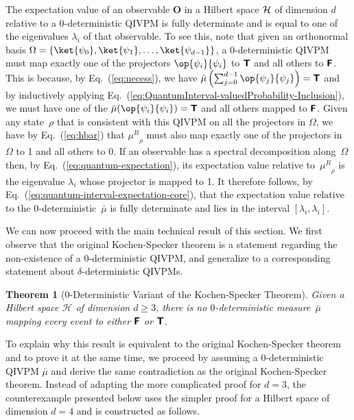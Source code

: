 \documentclass[english,reprint, aps, prl,superscriptaddress, showpacs,
showkeys, longbibliography, amsmath, amssymb, floatfix]{revtex4-1}
\theoremstyle{plain}
\newtheorem{thm}{Theorem}
\theoremstyle{definition}
\newcommand{\Hilb}{\mathcal{H}}
\newcommand{\interval}[1]{{\normalfont\textsf{\textbf{#1}}}}
\newcommand{\imposs}{\interval{F}}
\newcommand{\necess}{\interval{T}}
\newcommand{\proj}[1]{\op{#1}{#1}}
\newcommand{\muB}{\ensuremath{\mu^{B}}}
\begin{document}
The expectation value of an observable $\mathbf{O}$ in a Hilbert space
${\cal H}$ of dimension $d$ relative to a 0-deterministic QIVPM is
fully determinate and is equal to one of the eigenvalues $\lambda_i$
of that observable. To see this, note that given an orthonormal basis
$\Omega=\{ \ket{\psi_0},\ket{\psi_1},\ldots,\ket{\psi_{d-1}}\}$, a
0-deterministic QIVPM must map exactly one of the projectors
$\proj{\psi_i}$ to $\necess$ and all others to $\imposs$. This is
because, by Eq.~(\ref{eq:necess}), we have
$\bar{\mu}\left(\sum_{j=0}^{d-1}{\proj{\psi_j}}\right)=\necess$ and by
inductively applying
Eq.~(\ref{eq:QuantumInterval-valuedProbability-Inclusion}), we must
have one of the $\bar{\mu}(\proj{\psi_i})=\necess$ and all others
mapped to $\imposs$. Given any state~$\rho$ that is consistent with
this QIVPM on all the projectors in $\Omega$, we have by
Eq.~(\ref{eq:hbar}) that $\muB_{\rho}$ must also map exactly one of
the projectors in $\Omega$ to 1 and all others to 0. If an observable
has a spectral decomposition along~$\Omega$ then, by
Eq.~(\ref{eq:quantum-expectation}), its expectation value relative
to~$\muB_{\rho}$ is the eigenvalue $\lambda_i$ whose projector is
mapped to 1. It therefore follows, by
Eq.~(\ref{eq:quantum-interval-expectation-core}), that the expectation
value relative to the 0-deterministic~${\bar{\mu}}$ is fully
determinate and lies in the interval $[\lambda_i,\lambda_i]$.

We can now proceed with the main technical result of this section. We
first observe that the original Kochen-Specker theorem is a statement
regarding the non-existence of a $0$-deterministic QIVPM, and
generalize to a corresponding statement about $\delta$-deterministic QIVPMs.

\begin{thm}[0-Deterministic Variant of the Kochen-Specker
  Theorem] \label{thm:Kochen-Specker} Given a Hilbert space $\Hilb$ of
  dimension $d\ge3$, there is no $0$-deterministic measure~$\bar{\mu}$
  mapping every event to either $\imposs$ or $\necess$.
\end{thm}

\noindent To explain why this result is equivalent to the original
Kochen-Specker theorem and to prove it at the same time, we proceed by
assuming a 0-deterministic QIVPM $\bar{\mu}$ and derive the same
contradiction as the original Kochen-Specker theorem. Instead of
adapting the more complicated proof for $d=3$, the counterexample
presented below uses the simpler proof for a Hilbert space of
dimension $d=4$ and is constructed as follows.
\end{document}
